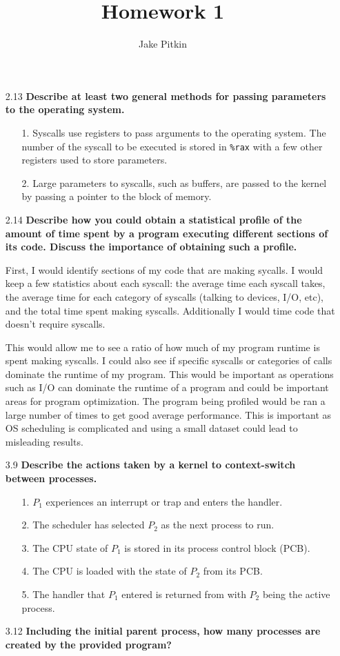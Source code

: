 \documentclass[fleqn]{hw}
\title{Homework 1}
\institute{University of Utah}
\author{Jake Pitkin}
\begin{document}
\maketitle

\begin{enumerate}

\item [2.13] \textbf{Describe at least two general methods for passing parameters to the operating system.}
\begin{enumerate}
\item [1.] Syscalls use registers to pass arguments to the operating system. The number of the syscall to be executed is stored in \texttt{\%rax} with a few other registers used to store parameters.
\item [2.] Large parameters to syscalls, such as buffers, are passed to the kernel by passing a pointer to the block of memory.
\end{enumerate}

\item [2.14] \textbf{Describe how you could obtain a statistical profile of the amount of time spent by a program executing different sections of its code. Discuss the importance of obtaining such a profile.}

First, I would identify sections of my code that are making sycalls. I would keep a few statistics about each syscall: the average time each syscall takes, the average time for each category of syscalls (talking to devices, I/O, etc), and the total time spent making syscalls. Additionally I would time code that doesn't require syscalls.

This would allow me to see a ratio of how much of my program runtime is spent making syscalls. I could also see if specific syscalls or categories of calls dominate the runtime of my program. This would be important as operations such as I/O can dominate the runtime of a program and could be important areas for program optimization. The program being profiled would be ran a large number of times to get good average performance. This is important as OS scheduling is complicated and using a small dataset could lead to misleading results.

\item [3.9] \textbf{Describe the actions taken by a kernel to context-switch between processes.}
\begin{enumerate}
\item [1.] $P_1$ experiences an interrupt or trap and enters the handler.
\item [2.] The scheduler has selected $P_2$ as the next process to run.
\item [3.] The CPU state of $P_1$ is stored in its process control block (PCB).
\item [4.] The CPU is loaded with the state of $P_2$ from its PCB.
\item [5.] The handler that $P_1$ entered is returned from with $P_2$ being the active process.
\end{enumerate}
\item [3.12] \textbf{Including the initial parent process, how many processes are created by the provided program?}


\end{enumerate}
\end{document}
